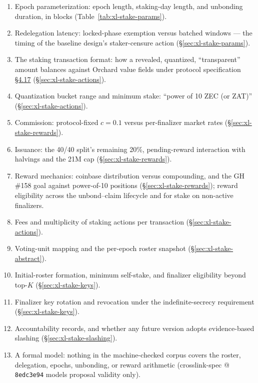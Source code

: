 \documentclass[11pt,a4paper]{article}
\theoremstyle{definition}
\begin{document}
\begin{enumerate}
\item Epoch parameterization: epoch length, staking-day length, and
  unbonding duration, in blocks
  (Table~\ref{tab:xl-stake-params}).
\item Redelegation latency: locked-phase exemption versus batched
  windows --- the timing of the baseline design's staker-censure action
  (\S\ref{sec:xl-stake-params}).
\item The staking transaction format: how a revealed, quantized,
  ``transparent'' amount balances against Orchard value fields under
  protocol specification \href{https://zips.z.cash/protocol/protocol.pdf\#chainvaluepoolbalances}{\S4.17} (\S\ref{sec:xl-stake-actions}).
\item Quantization bucket range and minimum stake: ``power of 10 ZEC
  (or ZAT)'' (\S\ref{sec:xl-stake-actions}).
\item Commission: protocol-fixed $c = 0.1$ versus per-finalizer market
  rates (\S\ref{sec:xl-stake-rewards}).
\item Issuance: the 40/40 split's remaining 20\%, pending-reward
  interaction with halvings and the 21M cap
  (\S\ref{sec:xl-stake-rewards}).
\item Reward mechanics: coinbase distribution versus compounding, and
  the GH \#158 goal against power-of-10 positions
  (\S\ref{sec:xl-stake-rewards}); reward eligibility across the
  unbond--claim lifecycle and for stake on non-active finalizers.
\item Fees and multiplicity of staking actions per transaction
  (\S\ref{sec:xl-stake-actions}).
\item Voting-unit mapping and the per-epoch roster snapshot
  (\S\ref{sec:xl-stake-abstract}).
\item Initial-roster formation, minimum self-stake, and finalizer
  eligibility beyond top-$K$ (\S\ref{sec:xl-stake-keys}).
\item Finalizer key rotation and revocation under the
  indefinite-secrecy requirement (\S\ref{sec:xl-stake-keys}).
\item Accountability records, and whether any future version adopts
  evidence-based slashing (\S\ref{sec:xl-stake-slashing}).
\item A formal model: nothing in the machine-checked corpus covers the
  roster, delegation, epochs, unbonding, or reward arithmetic
  (crosslink-spec @ \texttt{8edc3e94} models proposal validity only).
\end{enumerate}
\end{document}
